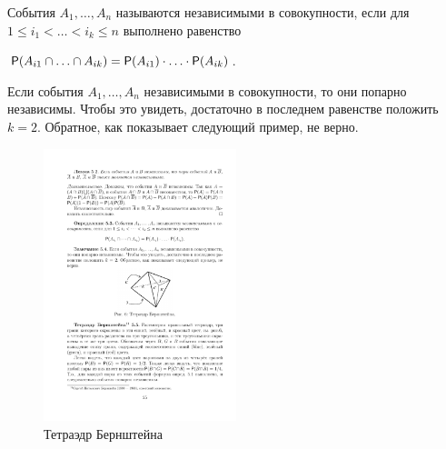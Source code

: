 \begin{definition}
\label{def:5.3}
События $A_1,\dots,A_n$ называются независимыми в совокупности, если для $1 \leqslant i_1 < \dots < i_k \leqslant n$ выполнено равенство

$\P(A_{i1}\cap \dots \cap  A_{ik}) = \P(A_{i1}) \cdot\ldots\cdot \P(A_{ik})$.
\end{definition}

\begin{zam} 
\label{zam:5.4}
Если события $A_1, \dots ,A_n$ независимыми в совокупности,
то они попарно независимы. Чтобы это увидеть, достаточно в последнем равенстве положить $k = 2$. Обратное, как показывает следующий пример, не верно.
\end{zam}

\begin{figure}[H]
	\centering
	\includegraphics[width=0.5\textwidth]{pic/pic6.pdf}
	\caption{Тетраэдр Бернштейна}
	\label{fig6}
\end{figure}

